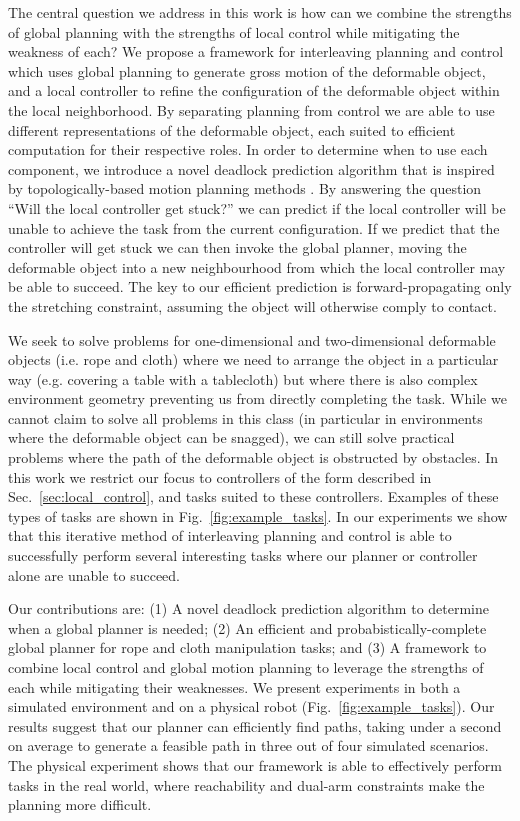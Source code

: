 The central question we address in this work is how can we combine the strengths of global planning with the strengths of local control while mitigating the weakness of each? We propose a framework for interleaving planning and control which uses global planning to generate gross motion of the deformable object, and a local controller to refine the configuration of the deformable object within the local neighborhood. By separating planning from control we are able to use different representations of the deformable object, each suited to efficient computation for their respective roles. In order to determine when to use each component, we introduce a novel deadlock prediction algorithm that is inspired by topologically-based motion planning methods \citep{Bhattacharya2012,Jaillet2008}. By answering the question ``Will the local controller get stuck?'' we can predict if the local controller will be unable to achieve the task from the current configuration. If we predict that the controller will get stuck we can then invoke the global planner, moving the deformable object into a new neighbourhood from which the local controller may be able to succeed. The key to our efficient prediction is forward-propagating only the stretching constraint, assuming the object will otherwise comply to contact.

We seek to solve problems for one-dimensional and two-dimensional deformable objects (i.e. rope and cloth) where we need to arrange the object in a particular way (e.g. covering a table with a tablecloth) but where there is also complex environment geometry preventing us from directly completing the task. While we cannot claim to solve all problems in this class (in particular in environments where the deformable object can be snagged), we can still solve practical problems where the path of the deformable object is obstructed by obstacles. In this work we restrict our focus to controllers of the form described in Sec.~\ref{sec:local_control}, and tasks suited to these controllers. Examples of these types of tasks are shown in Fig.~\ref{fig:example_tasks}. In our experiments we show that this iterative method of interleaving planning and control is able to successfully perform several interesting tasks where our planner or controller alone are unable to succeed.

Our contributions are: (1) A novel deadlock prediction algorithm to determine when a global planner is needed; (2) An efficient and probabistically-complete global planner for rope and cloth manipulation tasks; and (3) A framework to combine local control and global motion planning to leverage the strengths of each while mitigating their weaknesses. We present experiments in both a simulated environment and on a physical robot (Fig.~\ref{fig:example_tasks}). Our results suggest that our planner can efficiently find paths, taking under a second on average to generate a feasible path in three out of four simulated scenarios. The physical experiment shows that our framework is able to effectively perform tasks in the real world, where reachability and dual-arm constraints make the planning more difficult.







